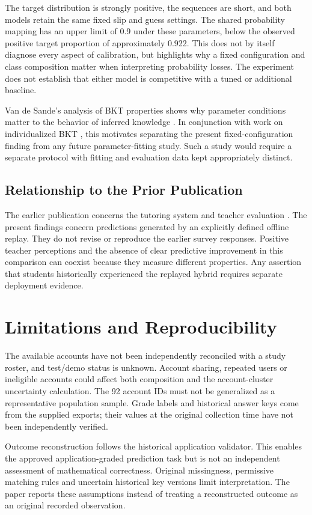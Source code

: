 \documentclass[conference]{IEEEtran}
\begin{document}
The target distribution is strongly positive, the sequences are short, and both models retain the same fixed slip and guess settings. The shared probability mapping has an upper limit of 0.9 under these parameters, below the observed positive target proportion of approximately 0.922. This does not by itself diagnose every aspect of calibration, but highlights why a fixed configuration and class composition matter when interpreting probability losses. The experiment does not establish that either model is competitive with a tuned or additional baseline.

Van de Sande's analysis of BKT properties shows why parameter conditions matter to the behavior of inferred knowledge \cite{vandesande2013}. In conjunction with work on individualized BKT \cite{pardos2010individualization}, this motivates separating the present fixed-configuration finding from any future parameter-fitting study. Such a study would require a separate protocol with fitting and evaluation data kept appropriately distinct.

\subsection{Relationship to the Prior Publication}
The earlier publication concerns the tutoring system and teacher evaluation \cite{ruiz2026}. The present findings concern predictions generated by an explicitly defined offline replay. They do not revise or reproduce the earlier survey responses. Positive teacher perceptions and the absence of clear predictive improvement in this comparison can coexist because they measure different properties. Any assertion that students historically experienced the replayed hybrid requires separate deployment evidence.

\section{Limitations and Reproducibility}
The available accounts have not been independently reconciled with a study roster, and test/demo status is unknown. Account sharing, repeated users or ineligible accounts could affect both composition and the account-cluster uncertainty calculation. The 92 account IDs must not be generalized as a representative population sample. Grade labels and historical answer keys come from the supplied exports; their values at the original collection time have not been independently verified.

Outcome reconstruction follows the historical application validator. This enables the approved application-graded prediction task but is not an independent assessment of mathematical correctness. Original missingness, permissive matching rules and uncertain historical key versions limit interpretation. The paper reports these assumptions instead of treating a reconstructed outcome as an original recorded observation.
\end{document}
